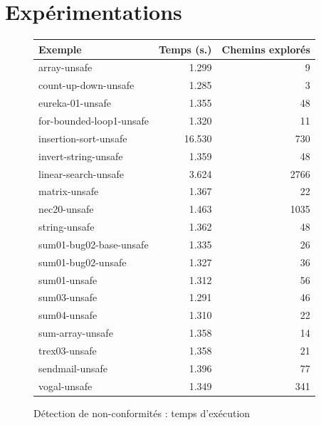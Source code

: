 \section{Expérimentations}
\label{sec:stady-exp}


\begin{figure}[tb]\scriptsize
  \begin{center}
    \begin{tabular}{lrr}
      \hline
      Exemple & Temps (s.) & Chemins explorés \\ \hline
      array-unsafe & 1.299 & 9 \\ \hline
      count-up-down-unsafe & 1.285 & 3 \\ \hline
      eureka-01-unsafe & 1.355 & 48 \\ \hline
      for-bounded-loop1-unsafe & 1.320 & 11 \\ \hline
      insertion-sort-unsafe & 16.530 & 730 \\ \hline
      invert-string-unsafe & 1.359 & 48 \\ \hline
      linear-search-unsafe & 3.624 & 2766 \\ \hline
      matrix-unsafe & 1.367 & 22 \\ \hline
      nec20-unsafe & 1.463 & 1035 \\ \hline
      string-unsafe & 1.362 & 48 \\ \hline
      sum01-bug02-base-unsafe & 1.335 & 26 \\ \hline
      sum01-bug02-unsafe & 1.327 & 36 \\ \hline
      sum01-unsafe & 1.312 & 56 \\ \hline
      sum03-unsafe & 1.291 & 46 \\ \hline
      sum04-unsafe & 1.310 & 22 \\ \hline
      sum-array-unsafe & 1.358 & 14 \\ \hline
      trex03-unsafe & 1.358 & 21 \\ \hline
      sendmail-unsafe & 1.396 & 77 \\ \hline
      vogal-unsafe & 1.349 & 341 \\ \hline
    \end{tabular}
  \end{center}
  \vspace{-3mm}
  \caption{Détection de non-conformités : temps d'exécution}    
  \label{fig:scam-experiments1}
\end{figure}

